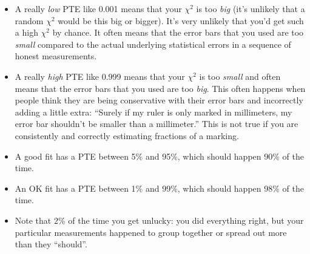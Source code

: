 \documentclass[11pt]{hmcpset}
\begin{document}
\begin{problem}
\begin{itemize}
	    \begin{itemize}
	    	\item A really \textit{low} PTE like 0.001 means that your $\chi^2$ is too \textit{big} (it's unlikely that a random  $\chi^2$ would be this big or bigger). It's very unlikely that you'd get such a high $\chi^2$ by chance. It often means that the error bars that you used are too \textit{small} compared to the actual underlying statistical errors in a sequence of honest measurements.
	    	\item A really \textit{high} PTE like 0.999 means that your $\chi^2$ is too \textit{small} and often means that the error bars that you used are too \textit{big}. This often happens when people think they are being conservative with their error bars and incorrectly adding a little extra: ``Surely if my ruler is only marked in millimeters, my error bar shouldn't be smaller than a millimeter.'' This is not true if you are consistently and correctly estimating fractions of a marking.
	    	\item A good fit has a PTE between 5\% and 95\%, which should happen 90\% of the time.
	    	\item An OK fit has a PTE between 1\% and 99\%, which should happen 98\% of the time.
	    	\item Note that 2\% of the time you get unlucky: you did everything right, but your particular measurements happened to group together or spread out more than they ``should''.
	    \end{itemize}
\end{itemize}

\end{problem}




\pagebreak
\end{document}
